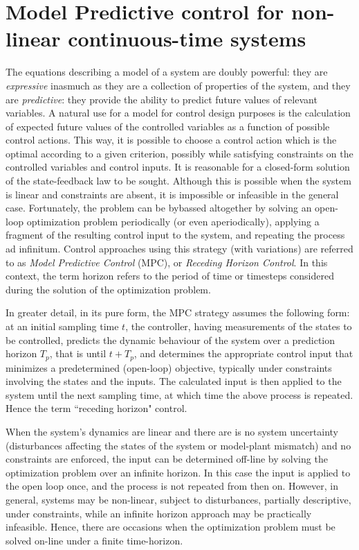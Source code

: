 \section{Model Predictive control for non-linear continuous-time systems}

The equations describing a model of a system are doubly powerful: they
are \textit{expressive} inasmuch as they are a collection of properties of the
system, and they are \textit{predictive}: they provide the ability to predict
future values of relevant variables. A natural use for a model for control
design purposes is the calculation of expected future values of the controlled
variables as a function of possible control actions. This way, it is possible
to choose a control action which is the optimal according to a given criterion,
possibly while satisfying constraints on the controlled variables and control
inputs. It is reasonable for a closed-form solution of the state-feedback law
to be sought. Although this is possible when the system is linear and constraints
are absent, it is impossible or infeasible in the general case. Fortunately,
the problem can be bybassed altogether by solving an open-loop optimization
problem periodically (or even aperiodically), applying a fragment of
the resulting control input to the system, and repeating the process ad
infinitum. Control approaches using this strategy (with variations) are referred
to as \textit{Model Predictive Control} (MPC), or \textit{Receding Horizon Control}.
In this context, the term horizon refers to the period of time or timesteps
considered during the solution of the optimization problem.

In greater detail, in its pure form, the MPC strategy assumes the following
form: at an initial sampling time $t$, the controller, having measurements of
the states to be controlled, predicts the dynamic behaviour of the system over a
prediction horizon $T_p$, that is until $t+T_p$, and determines the appropriate
control input that minimizes a predetermined (open-loop) objective, typically
under constraints involving the states and the inputs. The calculated input
is then applied to the system until the next sampling time, at which time
the above process is repeated. Hence the term ``receding horizon" control.

When the system's dynamics are linear and there are is no system uncertainty
(disturbances affecting the states of the system or model-plant mismatch)
and no constraints are enforced, the input can be determined off-line by
solving the optimization problem over an infinite horizon. In this case the
input is applied to the open loop once, and the process is not repeated from
then on. However, in general, systems may be non-linear, subject to disturbances,
partially descriptive, under constraints, while an infinite horizon approach
may be practically infeasible. Hence, there are occasions when the optimization
problem must be solved on-line under a finite time-horizon.

